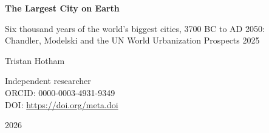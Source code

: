 \documentclass[11pt,a4paper]{article}
\begin{document}
\begin{center}
{\Large\bfseries The Largest City on Earth\par}
\vspace{0.4em}
{\large Six thousand years of the world's biggest cities, 3700 BC to AD 2050:\\Chandler, Modelski and the UN World Urbanization Prospects 2025\par}
\vspace{1.2em}
{\large Tristan Hotham\par}
\vspace{0.3em}
{\small Independent researcher\\
ORCID: 0000-0003-4931-9349\\
DOI: \href{https://doi.org/{{meta.doi}}}{https://doi.org/{{meta.doi}}}\par}
\vspace{0.8em}
2026
\end{center}
\end{document}
